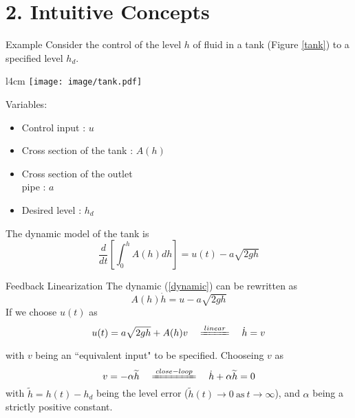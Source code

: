 \documentclass{beamer}
\begin{document}
  \section{2. Intuitive Concepts}

  \begin{frame}{Example}
    Consider the control of the level $h$ of fluid in a tank (Figure \ref{tank}) to a specified level $h_{d}$.

    \begin{wrapfigure}{l}{4cm}
    \vspace{-10pt}
    \texttt{[image: image/tank.pdf]}\\
    \vspace{-15pt}
    \caption{Fluid level control in a tank}\label{tank}
    \vspace{-10pt}
    \end{wrapfigure}

    Variables:
    \begin{itemize}
      \item Control input : $u$
      \item Cross section of the tank : $A(h)$
      \item Cross section of the outlet \\ pipe : $a$
      \item Desired level : $h_{d}$
    \end{itemize}

    The dynamic model of the tank is
    \begin{equation}\label{dynamic}
      \frac{d}{dt}\left[\int_{0}^{h}A(h)dh\right] = u(t) - a \sqrt{2gh}
    \end{equation}

  \end{frame}


  \begin{frame}{Feedback Linearization}
  The dynamic (\ref{dynamic}) can be rewritten as
  $$ A(h)\dot{h} = u-a\sqrt{2gh} $$
  If we choose $u(t)$ as
  $$ u(t) = a\sqrt{2gh} + A(h)v \quad \xlongequal{linear} \quad \dot{h}=v $$

  with $v$ being an ``equivalent input" to be specified.
  Chooseing $v$ as
  $$ v=-\alpha \widetilde{h} \quad \xlongequal{close-loop} \quad \dot{h}+\alpha \widetilde{h}=0 $$
  with $\widetilde{h} = h(t)-h_{d}$ being the level error ($\widetilde{h}(t)\rightarrow 0 ~\text{as}~ t \rightarrow \infty$), and $\alpha$ being a strictly positive constant.
  \end{frame}
\end{document}
